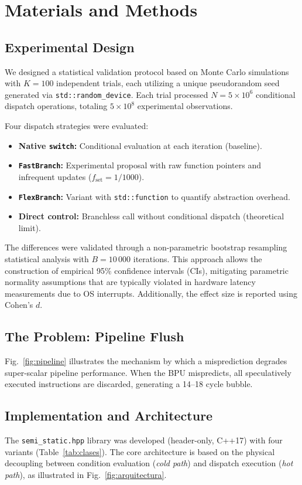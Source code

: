 \section{Materials and Methods}

\subsection{Experimental Design}
We designed a statistical validation protocol based on Monte Carlo simulations with $K = 100$ independent trials, each utilizing a unique pseudorandom seed generated via \texttt{std::random\_device}. Each trial processed $N = 5 \times 10^6$ conditional dispatch operations, totaling $5 \times 10^8$ experimental observations.

Four dispatch strategies were evaluated:
\begin{itemize}
    \item \textbf{Native \texttt{switch}:} Conditional evaluation at each iteration (baseline).
    \item \textbf{\texttt{FastBranch}:} Experimental proposal with raw function pointers and infrequent updates ($f_{\text{set}} = 1/1000$).
    \item \textbf{\texttt{FlexBranch}:} Variant with \texttt{std::function} to quantify abstraction overhead.
    \item \textbf{Direct control:} Branchless call without conditional dispatch (theoretical limit).
\end{itemize}

The differences were validated through a non-parametric bootstrap resampling statistical analysis with $B = 10\,000$ iterations. This approach allows the construction of empirical 95\% confidence intervals (CIs), mitigating parametric normality assumptions that are typically violated in hardware latency measurements due to OS interrupts. Additionally, the effect size is reported using Cohen's $d$.

\subsection{The Problem: Pipeline Flush}
Fig.~\ref{fig:pipeline} illustrates the mechanism by which a misprediction degrades super-scalar pipeline performance. When the BPU mispredicts, all speculatively executed instructions are discarded, generating a 14--18 cycle bubble.

\subsection{Implementation and Architecture}
The \texttt{semi\_static.hpp} library was developed (header-only, C++17) with four variants (Table~\ref{tab:clases}). The core architecture is based on the physical decoupling between condition evaluation (\textit{cold path}) and dispatch execution (\textit{hot path}), as illustrated in Fig.~\ref{fig:arquitectura}.

